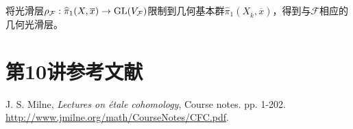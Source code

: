 \begin{note}[L10S3O4]
将光滑层$\rho_{\mathcal F}:\widehat\pi_1(X,\overline x)\to\operatorname{GL}(V_{\mathcal F})$限制到几何基本群$\widehat\pi_1(X_{\overline k},\overline x)$，得到与$\mathcal F$相应的几何光滑层。
\end{note}
\section{第10讲参考文献}\label{L10S4}
\begin{references}
 J. S. Milne, \emph{Lectures on étale cohomology}, Course notes. pp. 1-202. \url{http://www.jmilne.org/math/CourseNotes/CFC.pdf}.
\end{references}
